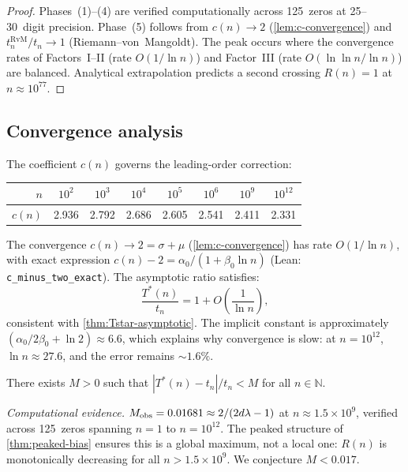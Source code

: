 \begin{proof}
Phases~(1)--(4) are verified computationally across 125~zeros at
25--30~digit precision.
Phase~(5) follows from $c(n) \to 2$
(\cref{lem:c-convergence}) and $t_n^{\mathrm{RvM}}/t_n \to 1$
(Riemann--von~Mangoldt). The peak occurs where the convergence rates
of Factors~I--II (rate $O(1/\ln n)$) and Factor~III (rate
$O(\ln\ln n/\ln n)$) are balanced.  Analytical extrapolation predicts
a second crossing $R(n) = 1$ at $n \approx 10^{77}$. \end{proof}

\subsection{Convergence analysis}\label{ssec:ratio-convergence}%

The coefficient $c(n)$ governs the leading-order correction:
\begin{center}
\begin{tabular}{rccccccc}
\toprule
$n$ & $10^2$ & $10^3$ & $10^4$ & $10^5$ & $10^6$ & $10^9$ & $10^{12}$ \\
\midrule
$c(n)$ & 2.936 & 2.792 & 2.686 & 2.605 & 2.541 & 2.411 & 2.331 \\
\bottomrule
\end{tabular}
\end{center}

\noindent
The convergence $c(n) \to 2 = \sigma + \mu$
(\cref{lem:c-convergence}) has rate
$O(1/\ln n)$, with exact expression
$c(n) - 2 = \alpha_0/(1 + \beta_0 \ln n)$
(Lean: \texttt{c\_minus\_two\_exact}).
The asymptotic ratio satisfies:
\[
  \frac{T^*(n)}{t_n} = 1 + O\!\left(\frac{1}{\ln n}\right),
\]
consistent with \cref{thm:Tstar-asymptotic}.
The implicit constant is approximately
$(\alpha_0/2\beta_0 + \ln 2) \approx 6.6$,
which explains why convergence is slow:
at $n = 10^{12}$, $\ln n \approx 27.6$, and the error remains
$\sim 1.6\%$.

\begin{Conjecture}\label{conj:bounded-error}
There exists $M > 0$ such that
$|T^*(n) - t_n|/t_n < M$ for all $n \in \mathbb{N}$.
\end{Conjecture}

\noindent
\emph{Computational evidence.}\;
$M_{\rm obs} = 0.01681 \approx 2/(2d\lambda-1)$ at $n \approx 1.5 \times 10^9$, verified
across 125~zeros spanning $n = 1$ to $n = 10^{12}$.
The peaked structure of \cref{thm:peaked-bias} ensures this is
a global maximum, not a local one: $R(n)$ is monotonically decreasing
for all $n > 1.5 \times 10^9$.  We conjecture $M < 0.017$.

